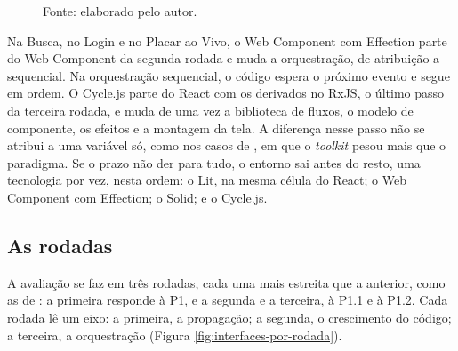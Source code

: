 \begin{figure}[htbp]

\small Fonte: elaborado pelo autor.
\end{figure}

Na Busca, no Login e no Placar ao Vivo, o Web Component com Effection
parte do Web Component da segunda rodada e muda a orquestração, de
atribuição a sequencial.
Na orquestração sequencial, o código espera o próximo evento e segue
em ordem.
O Cycle.js parte do React com os derivados no RxJS, o último passo da
terceira rodada, e muda de uma vez a biblioteca de fluxos, o modelo de
componente, os efeitos e a montagem da tela.
A diferença nesse passo não se atribui a uma variável só, como nos
casos de \textcite[p. 23]{kiss2014}, em que o \emph{toolkit} pesou mais
que o paradigma.
Se o prazo não der para tudo, o entorno sai antes do resto, uma
tecnologia por vez, nesta ordem: o Lit, na mesma célula do React; o
Web Component com Effection; o Solid; e o Cycle.js.
\subsection{As rodadas}
\label{sec:as-rodadas}

A avaliação se faz em três rodadas, cada uma mais estreita que a
anterior, como as de \textcite[p. 3]{kiss2014}: a primeira responde à
P1, e a segunda e a terceira, à P1.1 e à P1.2.
Cada rodada lê um eixo: a primeira, a propagação; a segunda, o
crescimento do código; a terceira, a orquestração
(Figura \ref{fig:interfaces-por-rodada}).

